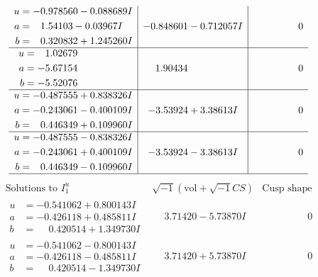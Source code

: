 \documentclass[1p]{elsarticle_modified}
\theoremstyle{definition}
\newcommand{\I}{\sqrt{-1}}
\begin{document}
$$\begin{array}{c|c|c}
\begin{aligned}
u &= -0.978560 - 0.088689 I \\
a &= \phantom{-}1.54103 - 0.03967 I \\
b &= \phantom{-}0.320832 + 1.245260 I\end{aligned}
 & -0.848601 - 0.712057 I & \phantom{-0.000000 } 0 \\ \hline\begin{aligned}
u &= \phantom{-}1.02679\phantom{ +0.000000I} \\
a &= -5.67154\phantom{ +0.000000I} \\
b &= -5.52076\phantom{ +0.000000I}\end{aligned}
 & \phantom{-}1.90434\phantom{ +0.000000I} & \phantom{-0.000000 } 0 \\ \hline\begin{aligned}
u &= -0.487555 + 0.838326 I \\
a &= -0.243061 - 0.400109 I \\
b &= \phantom{-}0.446349 + 0.109960 I\end{aligned}
 & -3.53924 + 3.38613 I & \phantom{-0.000000 } 0 \\ \hline\begin{aligned}
u &= -0.487555 - 0.838326 I \\
a &= -0.243061 + 0.400109 I \\
b &= \phantom{-}0.446349 - 0.109960 I\end{aligned}
 & -3.53924 - 3.38613 I & \phantom{-0.000000 } 0\\
 \hline 
 \end{array}$$\newpage$$\begin{array}{c|c|c}  
\text{Solutions to }I^u_{1}& \I (\text{vol} + \sqrt{-1}CS) & \text{Cusp shape}\\
 \hline 
\begin{aligned}
u &= -0.541062 + 0.800143 I \\
a &= -0.426118 + 0.485811 I \\
b &= \phantom{-}0.420514 + 1.349730 I\end{aligned}
 & \phantom{-}3.71420 - 5.73870 I & \phantom{-0.000000 } 0 \\ \hline\begin{aligned}
u &= -0.541062 - 0.800143 I \\
a &= -0.426118 - 0.485811 I \\
b &= \phantom{-}0.420514 - 1.349730 I\end{aligned}
 & \phantom{-}3.71420 + 5.73870 I & \phantom{-0.000000 } 0 \\ \hline\begin{aligned}

\end{aligned}
\end{array}$$
\end{document}
